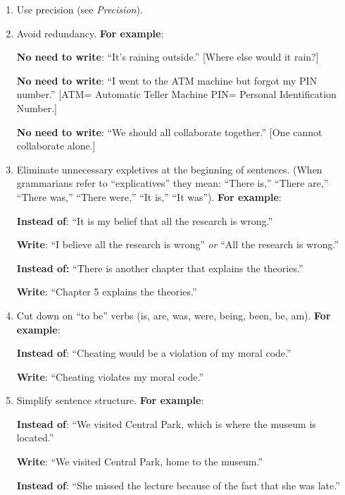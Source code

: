 \documentclass[12pt, hidelinks]{article} %
\begin{document}
 \begin{enumerate}
 
\item Use precision (see \emph{Precision}).
 
\item Avoid redundancy. \textbf{For example}:
 
\textbf{No need to write}: ``It's raining outside.''
[Where else would it rain?]
 
\textbf{No need to write}: ``I went to the ATM machine but forgot my PIN number.'' 
 [ATM= Automatic Teller Machine PIN= Personal Identification Number.]
 
\textbf{No need to write}: ``We should all collaborate together.'' 
[One cannot collaborate alone.]
 
 \item Eliminate unnecessary expletives at the beginning of sentences. (When grammarians refer to ``explicatives'' they mean: ``There is,'' ``There are,'' ``There was,'' ``There were,'' ``It is,'' ``It was''). \textbf{For example}:
 
  \textbf{Instead of}: ``It is my belief that all the research is wrong.''
 
                  	\textbf{Write}:		``I believe all the research is wrong'' \emph{or} ``All the research is wrong.''
 
 
             	\textbf{Instead of:}    	``There is another chapter that explains the theories.''
 
                    	\textbf{Write}:       	``Chapter 5 explains the theories.''
 
 
\item Cut down on ``to be'' verbs (is, are, was, were, being, been, be, am). \textbf{For example}:
 
      	\textbf{Instead of}:  	``Cheating would be a violation of my moral code.''
 
      	\textbf{Write}:          	``Cheating violates my moral code.''
 
 
\item Simplify sentence structure. \textbf{For example}:
 
    	\textbf{Instead of}: 	``We visited Central Park, which is where the museum is located.''
 
    	\textbf{Write}:          	``We visited Central Park, home to the museum.''
 
    	\textbf{Instead of}: ``She missed the lecture because of the fact that she was late.''
 

\end{enumerate}
\end{document}
